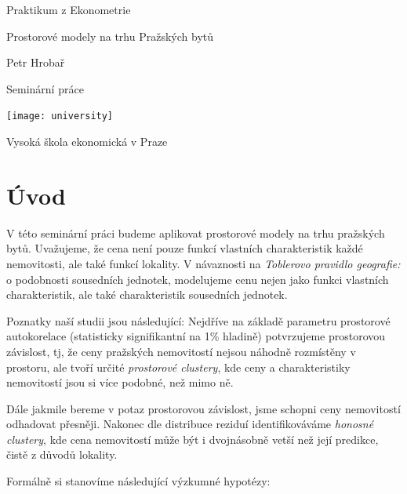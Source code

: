 \documentclass[11pt, a4paper]{article}
\begin{document}
\begin{titlepage}
\begin{center}
\vspace*{1cm}

\Huge
Praktikum z Ekonometrie

\vspace{0.5cm}
\LARGE
Prostorové modely na trhu Pražských bytů

\vspace{2.5cm}

Petr Hrobař

\vfill

Seminární práce

\vspace{0.8cm}

\texttt{[image: university]}

\Large
Vysoká škola ekonomická v Praze\\

\end{center}
\end{titlepage}


\clearpage


\clearpage
\section{Úvod}

V této seminární práci budeme aplikovat prostorové modely na trhu pražských bytů. Uvažujeme, že cena není pouze funkcí vlastních charakteristik každé nemovitosti, ale také funkcí lokality. V návaznosti na \textit{Toblerovo pravidlo geografie:} o podobnosti sousedních jednotek, modelujeme cenu nejen jako funkci vlastních charakteristik, ale také charakteristik sousedních jednotek. 

Poznatky naší studii jsou následující: Nejdříve na základě parametru prostorové autokorelace (statisticky signifikantní na 1\% hladině) potvrzujeme prostorovou závislost, tj, že ceny pražských nemovitostí nejsou náhodně rozmístěny v prostoru, ale tvoří určité \textit{prostorové clustery}, kde ceny a charakteristiky nemovitostí jsou si více podobné, než mimo ně. 

Dále jakmile bereme v potaz prostorovou závislost, jsme schopni ceny nemovitostí odhadovat přesněji. Nakonec dle distribuce reziduí identifikováváme \textit{honosné clustery}, kde cena nemovitostí může být i dvojnásobně vetší než její predikce, čistě z důvodů lokality.

Formálně si stanovíme následující výzkumné hypotézy:
  
\end{document}

